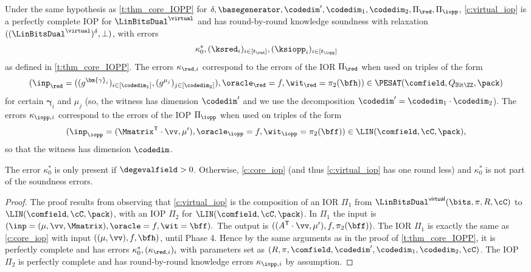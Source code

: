 \begin{theorem}\label{t:virtual_iop} 
 
   Under the same hypothesis as \cref{t:thm_core_IOPP} for $\delta,\basegenerator, \codedim',\codedim_1, \codedim_2, \Pi_\red, \Pi_\iopp$,  \cref{c:virtual_iop} is a perfectly complete IOP for $\LinBitsDual^{\virtual}$  and has round-by-round knowledge soundness with relaxation $((\LinBitsDual^{\virtual})^{\delta}, \bot)$, with errors $$\kappa_0^*, (\ksred_i)_{i\in [t_\red]}, (\ksiopp_i)_{i\in [t_\iopp]}$$ as defined in \cref{t:thm_core_IOPP}.  
   The errors $\kappa_{\red,i}$ correspond to the errors of  the IOR $\Pi_\red$ when used on triples of the form $$(\inp_\red=((g^{\bm{\gamma}_i})_{i\in [\codedim_1]}, (g^{\mu_j})_{j\in [\codedim_2]}), \oracle_\red=f, \wit_\red =\pi_2(\bfh))\in \PESAT(\comfield,Q_{\mathbb{B}\text{it}\ZZ}, \pack)$$ for certain $\bm{\gamma}_i$ and $\mu_j$ (so, the witness has dimension $\codedim'$ and we use the decomposition $\codedim' = \codedim_1 \cdot \codedim_2$). The errors $\kappa_{\iopp,i}$ correspond to the errors of  the IOP $\Pi_\iopp$ when used on triples of the form $$(\inp_\iopp=(\Mmatrix^\mathsf{T} \cdot \vv, \mu'), \oracle_\iopp=f, \wit_\iopp=\pi_2(\bff))\in \LIN(\comfield,\cC,\pack),$$
    so that the witness has dimension $\codedim$.


    The error $\kappa_0^*$ is only present if $\degevalfield>0$. Otherwise, \cref{c:core_iop} (and thus \cref{c:virtual_iop} has one round less) and $\kappa_0^*$ is not part of the soundness errors. 
\end{theorem}
\begin{proof}
     The proof results from observing that \cref{c:virtual_iop} is the composition of an IOR $\Pi_1$ from $\LinBitsDual^{\mathsf{virtual}}(\bits, \pi, R,\cC)$ to $\LIN(\comfield,\cC, \pack)$, with an IOP $\Pi_2$ for $\LIN(\comfield,\cC, \pack)$.  In $\Pi_1$ the input is $(\inp=(\mu,\vv, \Mmatrix), \oracle = f, \wit=\bff).$ The output is $((A^{\mathsf{T}}\cdot \vv, \mu'), f, \pi_2(\bff))$. The IOR  $\Pi_1$ is exactly the same as \cref{c:core_iop}  with input $((\mu, \vv), f, \bfh)$, until Phase 4. Hence by the same arguments as in the proof of \cref{t:thm_core_IOPP}, it is perfectly complete and has errors $\kappa_0^*, (\kappa_{\red,i})_i$ with parameters set as $(R,\pi, \comfield,\codedim',\codedim_1,\codedim_2,\cC)$. The IOP $\Pi_2$ is perfectly complete and has round-by-round knowledge errors $\kappa_{\iopp, i}$ by assumption.
\end{proof}


